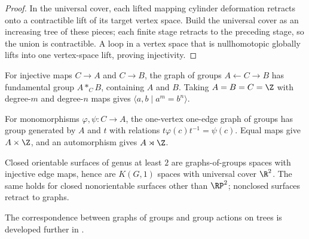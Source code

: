 \begin{proof}
\sketch In the universal cover, each lifted mapping cylinder deformation
retracts onto a contractible lift of its target vertex space. Build the
universal cover as an increasing tree of these pieces; each finite stage
retracts to the preceding stage, so the union is contractible. A loop in a
vertex space that is nullhomotopic globally lifts into one vertex-space lift,
proving injectivity.
\end{proof}

\begin{example}
\label{ex:free-product-with-amalgamation}

For injective maps $C\to A$ and $C\to B$, the graph of groups
$A\leftarrow C\to B$ has fundamental group $A*_C B$, containing $A$ and
$B$. Taking $A=B=C=\Z$ with degree-$m$ and degree-$n$ maps gives
$\langle a,b\mid a^m=b^n\rangle$.
\end{example}

\begin{example}
\label{ex:hnn-extension}

For monomorphisms $\varphi,\psi:C\to A$, the one-vertex one-edge graph of
groups has group generated by $A$ and $t$ with relations
$t\varphi(c)t^{-1}=\psi(c)$. Equal maps give $A\times\Z$, and an automorphism
gives $A\rtimes\Z$.
\end{example}

\begin{example}
\label{ex:closed-surfaces-are-kg1}

Closed orientable surfaces of genus at least $2$ are graphs-of-groups spaces
with injective edge maps, hence are $K(G,1)$ spaces with universal cover
$\R^2$. The same holds for closed nonorientable surfaces other than $\RP^2$;
nonclosed surfaces retract to graphs.
\end{example}

The correspondence between graphs of groups and group actions on trees is
developed further in \cite{ScottWall1979}.


